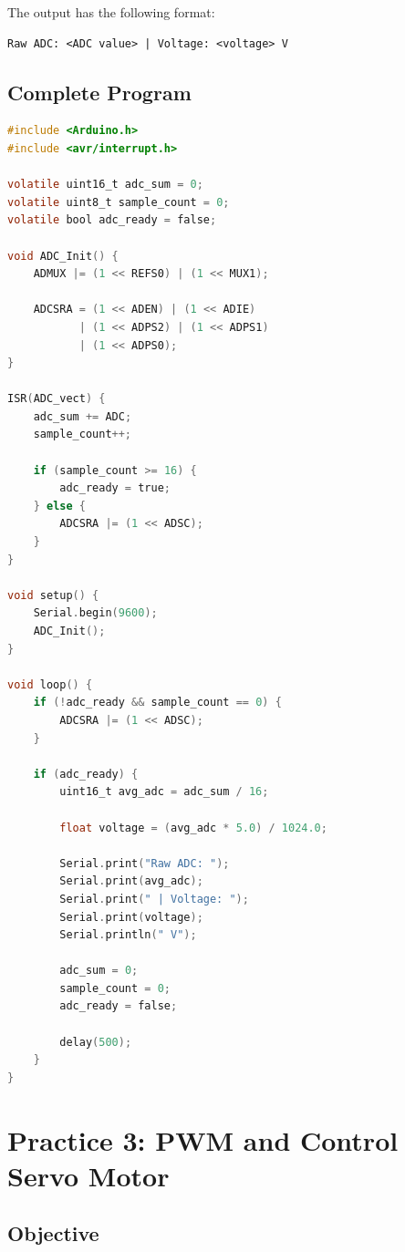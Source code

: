 \documentclass[12pt,a4paper]{article}
\begin{document}
The output has the following format:

\begin{lstlisting}
Raw ADC: <ADC value> | Voltage: <voltage> V
\end{lstlisting}

\subsection{Complete Program}

\begin{lstlisting}[language=C]
#include <Arduino.h>
#include <avr/interrupt.h>

volatile uint16_t adc_sum = 0;
volatile uint8_t sample_count = 0;
volatile bool adc_ready = false;

void ADC_Init() {
    ADMUX |= (1 << REFS0) | (1 << MUX1);

    ADCSRA = (1 << ADEN) | (1 << ADIE)
           | (1 << ADPS2) | (1 << ADPS1)
           | (1 << ADPS0);
}

ISR(ADC_vect) {
    adc_sum += ADC;
    sample_count++;

    if (sample_count >= 16) {
        adc_ready = true;
    } else {
        ADCSRA |= (1 << ADSC);
    }
}

void setup() {
    Serial.begin(9600);
    ADC_Init();
}

void loop() {
    if (!adc_ready && sample_count == 0) {
        ADCSRA |= (1 << ADSC);
    }

    if (adc_ready) {
        uint16_t avg_adc = adc_sum / 16;

        float voltage = (avg_adc * 5.0) / 1024.0;

        Serial.print("Raw ADC: ");
        Serial.print(avg_adc);
        Serial.print(" | Voltage: ");
        Serial.print(voltage);
        Serial.println(" V");

        adc_sum = 0;
        sample_count = 0;
        adc_ready = false;

        delay(500);
    }
}

\end{lstlisting}

\section{Practice 3: PWM and Control Servo Motor}

\subsection{Objective}
\end{document}
